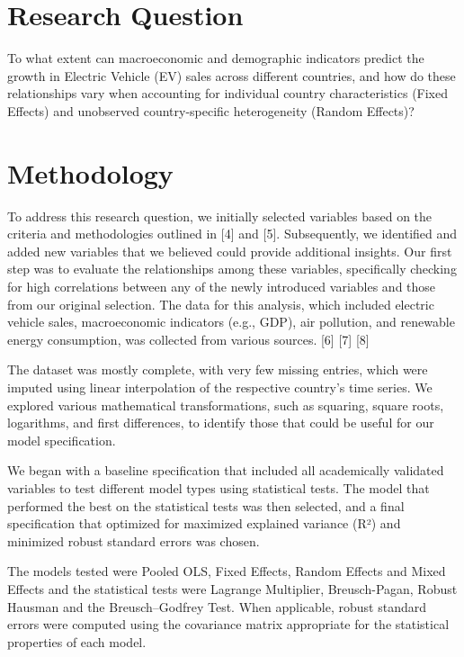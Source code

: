 \documentclass[
]{article}
\begin{document}
\section{\texorpdfstring{\textbf{Research
Question}}{Research Question}}\label{research-question}

To what extent can macroeconomic and demographic indicators predict the
growth in Electric Vehicle (EV) sales across different countries, and
how do these relationships vary when accounting for individual country
characteristics (Fixed Effects) and unobserved country-specific
heterogeneity (Random Effects)?

\section{\texorpdfstring{\textbf{Methodology}}{Methodology}}\label{methodology}

To address this research question, we initially selected variables based
on the criteria and methodologies outlined in {[}4{]} and {[}5{]}.
Subsequently, we identified and added new variables that we believed
could provide additional insights. Our first step was to evaluate the
relationships among these variables, specifically checking for high
correlations between any of the newly introduced variables and those
from our original selection. The data for this analysis, which included
electric vehicle sales, macroeconomic indicators (e.g., GDP), air
pollution, and renewable energy consumption, was collected from various
sources. {[}6{]} {[}7{]} {[}8{]}

The dataset was mostly complete, with very few missing entries, which
were imputed using linear interpolation of the respective country's time
series. We explored various mathematical transformations, such as
squaring, square roots, logarithms, and first differences, to identify
those that could be useful for our model specification.

We began with a baseline specification that included all academically
validated variables to test different model types using statistical
tests. The model that performed the best on the statistical tests was
then selected, and a final specification that optimized for maximized
explained variance (R²) and minimized robust standard errors was chosen.

The models tested were Pooled OLS, Fixed Effects, Random Effects and
Mixed Effects and the statistical tests were Lagrange Multiplier,
Breusch-Pagan, Robust Hausman and the Breusch--Godfrey Test. When
applicable, robust standard errors were computed using the covariance
matrix appropriate for the statistical properties of each model.
\end{document}
